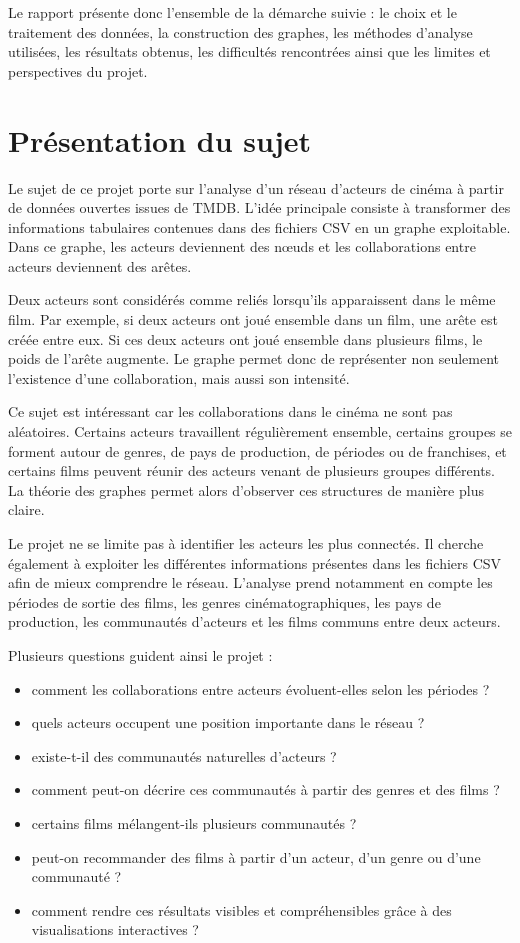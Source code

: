 \documentclass[11pt,a4paper,oneside,openany]{report}
\begin{document}
Le rapport présente donc l’ensemble de la démarche suivie : le choix et le traitement des données, la construction des graphes, les méthodes d’analyse utilisées, les résultats obtenus, les difficultés rencontrées ainsi que les limites et perspectives du projet.
\chapter{Présentation du sujet}

Le sujet de ce projet porte sur l’analyse d’un réseau d’acteurs de cinéma à partir de données ouvertes issues de TMDB. L’idée principale consiste à transformer des informations tabulaires contenues dans des fichiers CSV en un graphe exploitable. Dans ce graphe, les acteurs deviennent des nœuds et les collaborations entre acteurs deviennent des arêtes.

Deux acteurs sont considérés comme reliés lorsqu’ils apparaissent dans le même film. Par exemple, si deux acteurs ont joué ensemble dans un film, une arête est créée entre eux. Si ces deux acteurs ont joué ensemble dans plusieurs films, le poids de l’arête augmente. Le graphe permet donc de représenter non seulement l’existence d’une collaboration, mais aussi son intensité.

Ce sujet est intéressant car les collaborations dans le cinéma ne sont pas aléatoires. Certains acteurs travaillent régulièrement ensemble, certains groupes se forment autour de genres, de pays de production, de périodes ou de franchises, et certains films peuvent réunir des acteurs venant de plusieurs groupes différents. La théorie des graphes permet alors d’observer ces structures de manière plus claire.

Le projet ne se limite pas à identifier les acteurs les plus connectés. Il cherche également à exploiter les différentes informations présentes dans les fichiers CSV afin de mieux comprendre le réseau. L’analyse prend notamment en compte les périodes de sortie des films, les genres cinématographiques, les pays de production, les communautés d’acteurs et les films communs entre deux acteurs.

Plusieurs questions guident ainsi le projet :

\begin{itemize}
    \item comment les collaborations entre acteurs évoluent-elles selon les périodes ?
    \item quels acteurs occupent une position importante dans le réseau ?
    \item existe-t-il des communautés naturelles d’acteurs ?
    \item comment peut-on décrire ces communautés à partir des genres et des films ?
    \item certains films mélangent-ils plusieurs communautés ?
    \item peut-on recommander des films à partir d’un acteur, d’un genre ou d’une communauté ?
    \item comment rendre ces résultats visibles et compréhensibles grâce à des visualisations interactives ?
\end{itemize}
\end{document}
